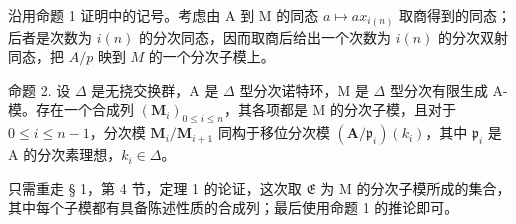   沿用命题 1 证明中的记号。考虑由 A 到 M 的同态 \(a \mapsto ax_{i(n)}\) 取商得到的同态；后者是次数为 \(i(n)\) 的分次同态，因而取商后给出一个次数为 \(i(n)\) 的分次双射同态，把 \(A / p\) 映到 \(M\) 的一个分次子模上。

命题 2. 设 \(\Delta\) 是无挠交换群，A 是 \(\Delta\) 型分次诺特环，M 是 \(\Delta\) 型分次有限生成 A-模。存在一个合成列 \((\mathbf{M}_i)_{0 \leqslant i \leqslant n}\)，其各项都是 M 的分次子模，且对于 \(0 \leqslant i \leqslant n - 1\)，分次模 \(\mathbf{M}_i / \mathbf{M}_{i+1}\) 同构于移位分次模 \((\mathbf{A} / \mathfrak{p}_i)(k_i)\)，其中 \(\mathfrak{p}_i\) 是 A 的分次素理想，\(k_i \in \Delta\)。

只需重走 § 1，第 4 节，定理 1 的论证，这次取 \(\mathfrak{E}\) 为 M 的分次子模所成的集合，其中每个子模都有具备陈述性质的合成列；最后使用命题 1 的推论即可。

